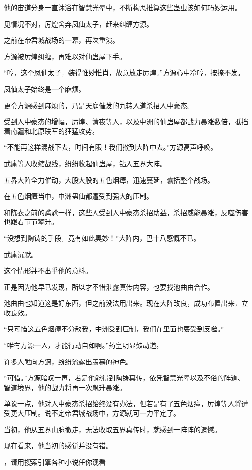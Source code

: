 \begin{this_body}
他的宙道分身一直沐浴在智慧光晕中，不断构思推算这些蛊虫该如何巧妙运用。

见情况不对，厉煌舍弃凤仙太子，赶来纠缠方源。

之前在帝君城战场的一幕，再次重演。

方源被厉煌纠缠，再难以对仙蛊屋下手。

“哼，这个凤仙太子，装得惟妙惟肖，故意放走厉煌。”方源心中冷哼，按捺不发。

凤仙太子始终是一个麻烦。

更令方源感到麻烦的，乃是天庭催发的九转人道杀招人中豪杰。

受到人中豪杰的增幅，厉煌、清夜等人，以及中洲的仙蛊屋都战力暴涨数倍，抵挡着南疆和北原联军的狂猛攻势。

“不能再这样混战下去，时间有限！我们撤到大阵中去。”方源高声呼唤。

武庸等人收缩战线，纷纷收起仙蛊屋，钻入五界大阵。

五界大阵全力催动，大股大股的五色烟瘴，迅速蔓延，囊括整个战场。

在五色烟瘴当中，中洲蛊仙都遭受到强大的压制。

和陈衣之前的尴尬一样，这些人受到人中豪杰杀招助益，杀招威能暴涨，反噬伤害也跟着节节攀升。

“没想到陶铸的手段，竟有如此奥妙！”大阵内，巴十八感慨不已。

武庸沉默。

这个情形并不出乎他的意料。

正是因为他早已发现，所以才不惜泄露真传内容，也要找池曲由合作。

池曲由也知道这是好东西，但之前没法用出来。现在大阵改良，成功布置出来，立收良效。

“只可惜这五色烟瘴不分敌我，中洲受到压制，我们在里面也要受到反噬。”

“唯有方源一人，才能行动自如啊。”药皇明显鼓动道。

许多人瞧向方源，纷纷流露出羡慕的神色。

“可惜。”方源暗叹一声，若是他能得到陶铸真传，依凭智慧光晕以及不俗的阵道、智道境界，他的战力将再一次飙升暴涨。

单说一点，他对人中豪杰杀招始终没有办法，但若是有了五色烟瘴，厉煌等人将遭受更大压制。说不定帝君城战场中，方源就可一力平定了。

当初，他从五界山脉撤走，无法收取五界真传时，就感到一阵阵的遗憾。

现在看来，他当初的感觉并没有错。

，请用搜索引擎各种小说任你观看

\end{this_body}

